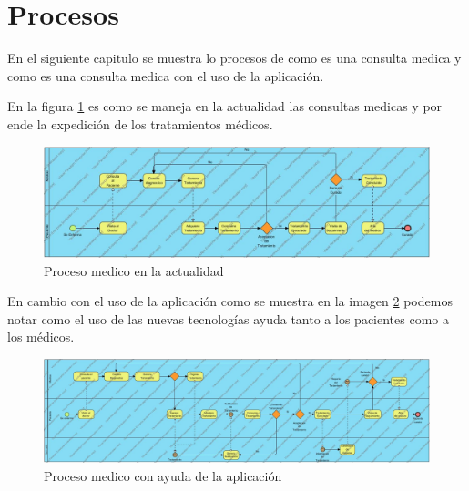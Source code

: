 \section{Procesos}

En el siguiente capitulo se muestra lo procesos de como es una consulta medica y como es una consulta medica con el uso de la aplicación.


En la figura \ref{fig:proceso1} es como se maneja en la actualidad las consultas medicas y por ende la expedición de los tratamientos médicos.
\begin{figure}[htb]
	\centering
	\includegraphics[width=1.1\textwidth]{images/cap2/ProcesoMedico}
	\caption{Proceso medico en la actualidad} \label{fig:proceso1}
\end{figure}

En cambio con el uso de la aplicación como se muestra en la imagen \ref{fig:proceso2} podemos notar como el uso de las nuevas tecnologías ayuda tanto a los pacientes como a los médicos.

\begin{figure}[htb]
	\centering
	\includegraphics[width=1.1\textwidth]{images/cap2/RemPillstratamiento}
	\caption{Proceso medico con ayuda de la aplicación} \label{fig:proceso2}
\end{figure}